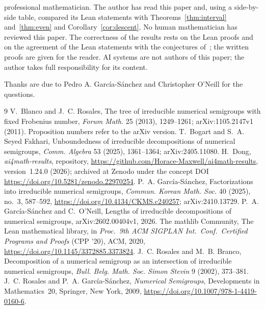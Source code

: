 \documentclass[11pt]{article}
\theoremstyle{definition}
\theoremstyle{remark}
\newcommand{\repoversion}{1.24.0}
\begin{document}
professional mathematician. The author has read this paper and, using a side-by-side table,
compared its Lean statements with Theorems~\ref{thm:interval} and~\ref{thm:even}
and Corollary~\ref{cor:descent}. No human mathematician has reviewed
this paper. The correctness of the results rests on the Lean proofs and on the
agreement of the Lean statements with the conjectures of~\cite{go}; the
written proofs are given for the reader. AI systems are not authors of this
paper; the author takes full responsibility for its content.

\medskip
\noindent Thanks are due to Pedro A. García-Sánchez and Christopher O'Neill
for the questions.

\begin{thebibliography}{9}
 V.~Blanco and J.~C. Rosales, The tree of irreducible numerical
semigroups with fixed Frobenius number, \emph{Forum Math.} 25 (2013),
1249--1261; arXiv:1105.2147v1 (2011). Proposition numbers refer to the arXiv
version.
 T.~Bogart and S.~A. Seyed Fakhari, Unboundedness of irreducible
decompositions of numerical semigroups, \emph{Comm. Algebra} 53 (2025),
1361--1364; arXiv:2405.11080.
 H.~Dong, \emph{ai4math-results}, repository,
\url{https://github.com/Horace-Maxwell/ai4math-results}, version~\repoversion{}
(2026); archived at Zenodo under the concept DOI
\url{https://doi.org/10.5281/zenodo.22970254}.
 P.~A. García-Sánchez, Factorizations into irreducible numerical
semigroups, \emph{Commun. Korean Math. Soc.} 40 (2025), no.~3, 587--592,
\url{https://doi.org/10.4134/CKMS.c240257}; arXiv:2410.13729.
 P.~A. García-Sánchez and C.~O'Neill, Lengths of irreducible
decompositions of numerical semigroups, arXiv:2602.00404v1, 2026.
The mathlib Community, The Lean mathematical library, in \emph{Proc.\ 9th ACM
SIGPLAN Int.\ Conf.\ Certified Programs and Proofs} (CPP '20), ACM, 2020,
\url{https://doi.org/10.1145/3372885.3373824}.
 J.~C. Rosales and M.~B. Branco, Decomposition of a numerical
semigroup as an intersection of irreducible numerical semigroups,
\emph{Bull. Belg. Math. Soc. Simon Stevin} 9 (2002), 373--381.
 J.~C. Rosales and P.~A. García-Sánchez, \emph{Numerical
Semigroups}, Developments in Mathematics~20, Springer, New York, 2009,
\url{https://doi.org/10.1007/978-1-4419-0160-6}.
\end{thebibliography}
\end{document}
